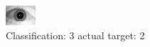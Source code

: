\begin{figure}[h!]
\begin{center}
\includegraphics[width=0.60\columnwidth]{figures/ID1696_class_3_target_2.png}
\end{center}
\caption{ Classification: 3 actual target: 2}
\label{fig:ID1696_class_3_target_2}
\end{figure}
